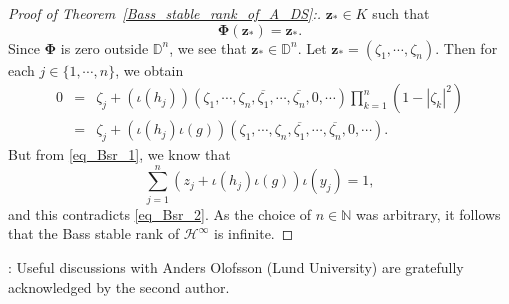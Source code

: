 \documentclass[11pt,reqno]{amsart}
\numberwithin{equation}{section}
\theoremstyle{definition}
\theoremstyle{definition}
\theoremstyle{definition}
\begin{document}
\begin{proof}[Proof of Theorem~\ref{Bass_stable_rank_of_A_DS}:]
$\mathbf{z}_*\in K$ such that
$$
\mathbf{\Phi}(\mathbf{z}_*)=\mathbf{z}_*.
$$
Since $\mathbf{\Phi}$ is zero outside ${\mathbb{D}}^n$, we see that
$\mathbf{z}_*\in {\mathbb{D}}^n$.  Let $\mathbf{z}_*=(\zeta_1,\cdots,
\zeta_n)$. Then for each $j\in \{1,\cdots, n\}$, we obtain
\begin{eqnarray}
\nonumber
0&=&\zeta_j + (\iota(h_j))(\zeta_1,\cdots, \zeta_n, 
\overline{\zeta_1},\cdots, \overline{\zeta_n},0,\cdots) 
\prod_{k=1}^n (1-|\zeta_k|^2)
\\
\label{eq_Bsr_2}  
&=& \zeta_j + (\iota(h_j) \iota(g))(\zeta_1,\cdots, \zeta_n, 
\overline{\zeta_1},\cdots, \overline{\zeta_n},0,\cdots).
\end{eqnarray}
But from \eqref{eq_Bsr_1}, we know that  
$$
\sum_{j=1}^n (z_j + \iota(h_j) \iota(g)) \iota(y_j)= 1 ,
$$
and this contradicts \eqref{eq_Bsr_2}.  As the choice of $n\in {\mathbb{N}}$
was arbitrary, it follows that the Bass stable rank of ${{{\mathscr{H}}^{\infty}}}$ is
infinite.
\end{proof}

: Useful discussions with Anders Olofsson (Lund
University) are gratefully acknowledged by the second author.
 
\end{document}
